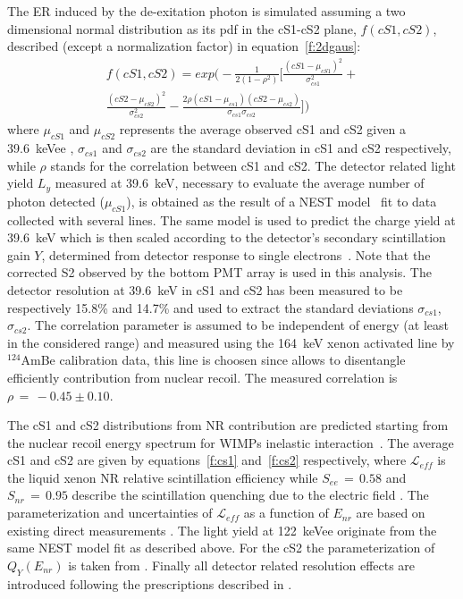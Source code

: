 The ER induced by the de-exitation photon is simulated assuming a two dimensional normal distribution as its pdf in the cS1-cS2 plane, $f(cS1,cS2)$, 
described (except a normalization factor) in equation~\ref{f:2dgaus}:
\begin{multline}
	f(cS1,cS2)  = exp \Big( -\frac{1}{2(1-\rho^2)} \Big[ \frac{(cS1 - \mu_{cS1})^2}{\sigma_{cs1}^2} + \\ 
	 \frac{(cS2 - \mu_{cS2})^2}{\sigma_{cs2}^2} - \frac{2\rho(cS1 - \mu_{cs1}) (cS2 - \mu_{cs2})} {\sigma_{cs1}\sigma_{cs2}} \Big] \Big) 
\label{f:2dgaus}
\end{multline}
where $\mu_{cS1}$ and $\mu_{cS2}$ 
represents the average observed cS1 and cS2 given a 39.6~keVee , $\sigma_{cs1}$ and $\sigma_{cs2}$ are the standard deviation in cS1 and cS2 respectively,
while $\rho$ stands for the correlation between cS1 and cS2.
The detector related light yield $L_y$ measured at 39.6~keV, necessary to evaluate the average number of photon detected ($\mu_{cS1}$),
is obtained as the result of a NEST model~\cite{NEST,Geant1,Geant2} fit to data collected with several lines.  The same model is used to predict the charge yield at
39.6~keV which is then scaled according to the detector's secondary scintillation gain $Y$, determined from detector response to single electrons~\cite{SingleE}.
Note that the corrected S2 observed by the bottom PMT array is used in this analysis.  
The detector resolution at 39.6~keV in cS1 and cS2 has been measured to be respectively 15.8\% and 14.7\% and used to extract the standard 
deviations $\sigma_{cs1}$, $\sigma_{cs2}$.  The correlation parameter is assumed to be independent of energy (at least in the considered range) and measured
using the 164~keV xenon activated line by $^{124}$AmBe calibration data, this line is choosen since allows to disentangle efficiently contribution from nuclear recoil.
The measured correlation is $\rho \, = \, -0.45 \pm 0.10$. 


The cS1 and cS2 distributions from NR contribution are predicted starting from the nuclear recoil energy spectrum
for WIMPs inelastic interaction~\cite{inelastic_th}. The average cS1 and cS2 are given by equations~\ref{f:cs1} and~\ref{f:cs2} respectively,
where $\mathcal{L}_{eff}$ is the liquid xenon NR relative scintillation efficiency while $S_{ee} \, = \, 0.58$  and $S_{nr} \, = \, 0.95$ describe the scintillation 
quenching due to the electric field \cite{ScintQuenching}. The parameterization and uncertainties of $\mathcal{L}_{eff}$ as a function of $E_{nr}$ are based on existing 
direct measurements \cite{run8Result}. The light yield at 122~keVee originate from the same NEST model fit as described above. For the cS2 the parameterization 
of $Q_{Y}(E_{nr})$ is taken from \cite{QY}.
Finally all detector related resolution effects are introduced following the prescriptions described in \cite{dataAnalysis}.

